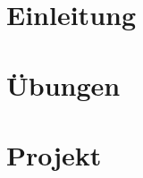 



\newcommand{\nr}{1}

\lstset{language=c}




\chapter{Einleitung}

\chapter{\"Ubungen}


\chapter{Projekt}

